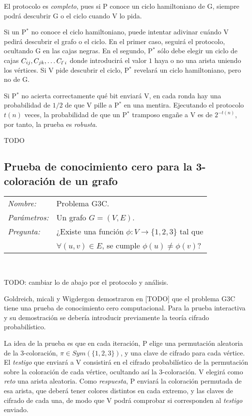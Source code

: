 \hfil


El protocolo es \textit{completo}, pues si P conoce un ciclo hamiltoniano de G, siempre podrá descubrir G o el ciclo cuando V lo pida.

Si un P$^*$ no conoce el ciclo hamiltoniano, puede intentar adivinar cuándo V pedirá descubrir el grafo o el ciclo. En el primer caso, seguirá el protocolo, ocultando G en las cajas negras. En el segundo, P$^*$ sólo debe elegir un ciclo de cajas  $C_{ij}, C_{jk}, \dots C_{l^`i}$ donde introducirá el valor $1$ haya o no una arista uniendo los vértices. Si V pide descubrir el ciclo, P$^*$ revelará un ciclo hamiltoniano, pero no de G.

Si P$^*$ no acierta correctamente qué bit enviará V, en cada ronda hay una probabilidad de $1/2$ de que V pille a P$^*$ en una mentira. Ejecutando el protocolo $t(n)$ veces, la probabilidad de que un P$^*$ tramposo engañe a V es de $2^{-t(n)}$, por tanto, la prueba es \textit{robusta}.

TODO

\subsection{Prueba de conocimiento cero para la 3-coloración de un grafo}


\hfil

\begin{tabular}{|ll}
	\textit{Nombre:} & Problema G3C. \\
	\textit{Parámetros:} &Un grafo $G=(V,E)$. \\
	\textit{Pregunta:} & ¿Existe una función $\phi : V \to \{1,2,3\}$ tal que \\ & $\forall (u,v)\in E$, se cumple $\phi(u)\neq \phi(v)$? \\
\end{tabular}
\\

\hfil

TODO: cambiar lo de abajo por el  protocolo y análisis.

Goldreich, micali y Wigdergon demostraron en [TODO] que el problema G3C tiene una prueba de conocimiento cero computacional. Para la prueba interactiva y su demostración se debería introducir previamente la teoría cifrado probabilístico.

La idea de la prueba es que en cada iteración, P elige una permutación aleatoria de la 3-coloración, $\pi \in Sym(\{1,2,3\})$, y una clave de cifrado para cada vértice. El \textit{testigo} que enviará a V consistirá en el cifrado probabilístico de la permutación sobre la coloración de cada vértice, ocultando así la 3-coloración. V elegirá como \textit{reto} una arista aleatoria. Como \textit{respuesta}, P enviará la coloración permutada de esa arista, que deberá tener colores distintos en cada extremo, y las claves de cifrado de cada una, de modo que V podrá comprobar si corresponden al \textit{testigo} enviado.

